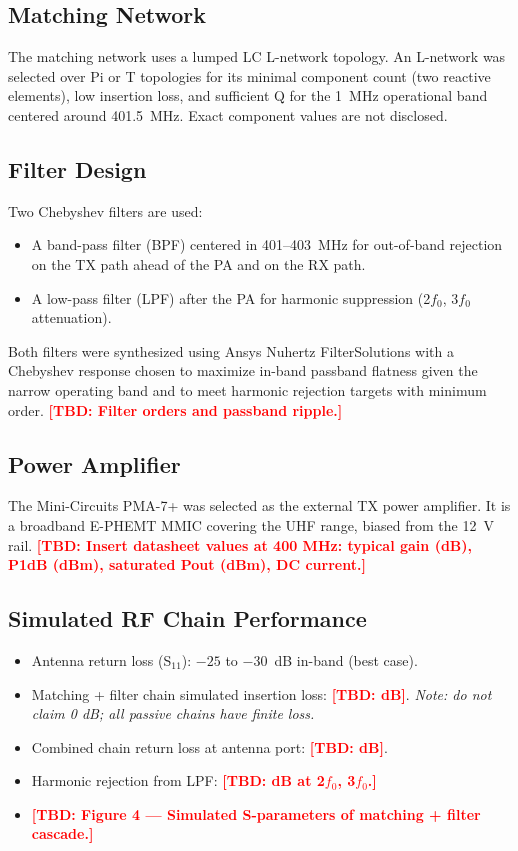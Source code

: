 \documentclass[conference]{IEEEtran}
\newcommand{\tbd}[1]{\textcolor{red}{\textbf{[TBD: #1]}}}
\begin{document}
\subsection{Matching Network}
The matching network uses a lumped LC L-network topology. An L-network was selected over Pi or T topologies for its minimal component count (two reactive elements), low insertion loss, and sufficient Q for the 1~MHz operational band centered around 401.5~MHz. Exact component values are not disclosed.

\subsection{Filter Design}
Two Chebyshev filters are used:
\begin{itemize}
\item A band-pass filter (BPF) centered in 401--403~MHz for out-of-band rejection on the TX path ahead of the PA and on the RX path.
\item A low-pass filter (LPF) after the PA for harmonic suppression (2$f_0$, 3$f_0$ attenuation).
\end{itemize}
Both filters were synthesized using Ansys Nuhertz FilterSolutions with a Chebyshev response chosen to maximize in-band passband flatness given the narrow operating band and to meet harmonic rejection targets with minimum order. \tbd{Filter orders and passband ripple.}

\subsection{Power Amplifier}
The Mini-Circuits PMA-7+ was selected as the external TX power amplifier. It is a broadband E-PHEMT MMIC covering the UHF range, biased from the 12~V rail. \tbd{Insert datasheet values at 400 MHz: typical gain (dB), P1dB (dBm), saturated Pout (dBm), DC current.}

\subsection{Simulated RF Chain Performance}
\begin{itemize}
\item Antenna return loss (S$_{11}$): $-25$ to $-30$~dB in-band (best case).
\item Matching + filter chain simulated insertion loss: \tbd{dB}. \textit{Note: do not claim 0 dB; all passive chains have finite loss.}
\item Combined chain return loss at antenna port: \tbd{dB}.
\item Harmonic rejection from LPF: \tbd{dB at 2$f_0$, 3$f_0$.}
\item \tbd{Figure 4 --- Simulated S-parameters of matching + filter cascade.}
\end{itemize}
\end{document}
